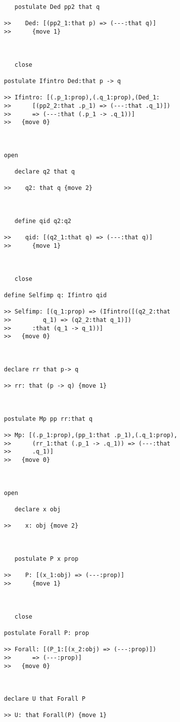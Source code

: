 \documentclass[12pt]{article}
\begin{document}
\begin{verbatim}
   postulate Ded pp2 that q

>>    Ded: [(pp2_1:that p) => (---:that q)]
>>      {move 1}



   close

postulate Ifintro Ded:that p -> q

>> Ifintro: [(.p_1:prop),(.q_1:prop),(Ded_1:
>>      [(pp2_2:that .p_1) => (---:that .q_1)])
>>      => (---:that (.p_1 -> .q_1))]
>>   {move 0}



open

   declare q2 that q

>>    q2: that q {move 2}



   define qid q2:q2

>>    qid: [(q2_1:that q) => (---:that q)]
>>      {move 1}



   close

define Selfimp q: Ifintro qid

>> Selfimp: [(q_1:prop) => (Ifintro([(q2_2:that
>>         q_1) => (q2_2:that q_1)])
>>      :that (q_1 -> q_1))]
>>   {move 0}



declare rr that p-> q

>> rr: that (p -> q) {move 1}



postulate Mp pp rr:that q

>> Mp: [(.p_1:prop),(pp_1:that .p_1),(.q_1:prop),
>>      (rr_1:that (.p_1 -> .q_1)) => (---:that
>>      .q_1)]
>>   {move 0}



open

   declare x obj

>>    x: obj {move 2}



   postulate P x prop

>>    P: [(x_1:obj) => (---:prop)]
>>      {move 1}



   close

postulate Forall P: prop

>> Forall: [(P_1:[(x_2:obj) => (---:prop)])
>>      => (---:prop)]
>>   {move 0}



declare U that Forall P

>> U: that Forall(P) {move 1}




\end{verbatim}
\end{document}
